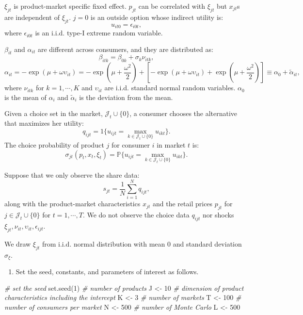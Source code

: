 \documentclass[
]{book}
\newenvironment{Shaded}{\begin{snugshade}}{\end{snugshade}}
\newcommand{\CommentTok}[1]{\textcolor[rgb]{0.56,0.35,0.01}{\textit{#1}}}
\newcommand{\DecValTok}[1]{\textcolor[rgb]{0.00,0.00,0.81}{#1}}
\newcommand{\FunctionTok}[1]{\textcolor[rgb]{0.00,0.00,0.00}{#1}}
\newcommand{\NormalTok}[1]{#1}
\newcommand{\OtherTok}[1]{\textcolor[rgb]{0.56,0.35,0.01}{#1}}
\providecommand{\tightlist}{%
  \setlength{\itemsep}{0pt}\setlength{\parskip}{0pt}}
\begin{document}
\(\xi_{jt}\) is product-market specific fixed effect. \(p_{jt}\) can be correlated with \(\xi_{jt}\) but \(x_{jt}\)s are independent of \(\xi_{jt}\). \(j = 0\) is an outside option whose indirect utility is:
\[
u_{it0} = \epsilon_{i0t},
\]
where \(\epsilon_{i0t}\) is an i.i.d. type-I extreme random variable.

\(\beta_{it}\) and \(\alpha_{it}\) are different across consumers, and they are distributed as:
\[
\beta_{itk} = \beta_{0k} + \sigma_k \nu_{itk},
\]
\[
\alpha_{it} = - \exp(\mu + \omega \upsilon_{it}) = - \exp(\mu + \frac{\omega^2}{2}) + [- \exp(\mu + \omega \upsilon_{it}) + \exp(\mu + \frac{\omega^2}{2})] \equiv \alpha_0 + \tilde{\alpha}_{it},
\]
where \(\nu_{itk}\) for \(k = 1, \cdots, K\) and \(\upsilon_{it}\) are i.i.d. standard normal random variables. \(\alpha_0\) is the mean of \(\alpha_i\) and \(\tilde{\alpha}_i\) is the deviation from the mean.

Given a choice set in the market, \(\mathcal{J}_t \cup \{0\}\), a consumer chooses the alternative that maximizes her utility:
\[
q_{ijt} = 1\{u_{ijt} = \max_{k \in \mathcal{J}_t \cup \{0\}} u_{ikt}\}.
\]
The choice probability of product \(j\) for consumer \(i\) in market \(t\) is:
\[
\sigma_{jt}(p_t, x_t, \xi_t) = \mathbb{P}\{u_{ijt} = \max_{k \in \mathcal{J}_t \cup \{0\}} u_{ikt}\}.
\]

Suppose that we only observe the share data:
\[
s_{jt} = \frac{1}{N} \sum_{i = 1}^N q_{ijt},
\]
along with the product-market characteristics \(x_{jt}\) and the retail prices \(p_{jt}\) for \(j \in \mathcal{J}_t \cup \{0\}\) for \(t = 1, \cdots, T\). We do not observe the choice data \(q_{ijt}\) nor shocks \(\xi_{jt}, \nu_{it}, \upsilon_{it}, \epsilon_{ijt}\).

We draw \(\xi_{jt}\) from i.i.d. normal distribution with mean 0 and standard deviation \(\sigma_{\xi}\).

\begin{enumerate}
\def\labelenumi{\arabic{enumi}.}
\tightlist
\item
  Set the seed, constants, and parameters of interest as follows.
\end{enumerate}

\begin{Shaded}
\begin{Highlighting}[]
\CommentTok{\# set the seed}
\FunctionTok{set.seed}\NormalTok{(}\DecValTok{1}\NormalTok{)}
\CommentTok{\# number of products}
\NormalTok{J }\OtherTok{\textless{}{-}} \DecValTok{10}
\CommentTok{\# dimension of product characteristics including the intercept}
\NormalTok{K }\OtherTok{\textless{}{-}} \DecValTok{3}
\CommentTok{\# number of markets}
\NormalTok{T }\OtherTok{\textless{}{-}} \DecValTok{100}
\CommentTok{\# number of consumers per market}
\NormalTok{N }\OtherTok{\textless{}{-}} \DecValTok{500}
\CommentTok{\# number of Monte Carlo}
\NormalTok{L }\OtherTok{\textless{}{-}} \DecValTok{500}
\end{Highlighting}
\end{Shaded}
\end{document}
